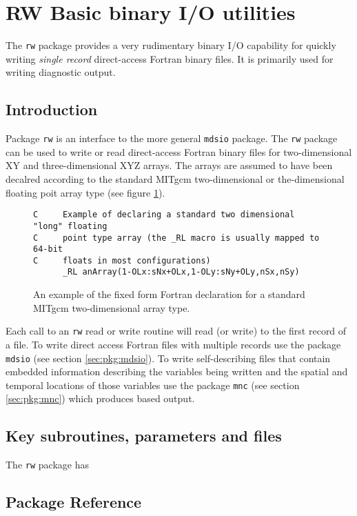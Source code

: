 \section{RW Basic binary I/O utilities}
\label{sec:pkg:rw}
The {\tt rw} package provides a very rudimentary binary I/O capability
for quickly writing {\it single record} direct-access Fortran binary files. 
It is primarily used for writing diagnostic output.

\subsection{Introduction}
Package {\tt rw} is an interface to the more general {\tt mdsio} package.
The {\tt rw} package can be used to write or read direct-access Fortran 
binary files for two-dimensional XY and three-dimensional XYZ arrays. 
The arrays are assumed to have been decalred according to the standard
MITgcm two-dimensional or the-dimensional floating poit array type 
(see figure \ref{fig:pkg:rw:standarddeclaration}).

\begin{figure}
\begin{verbatim}
C     Example of declaring a standard two dimensional "long" floating
C     point type array (the _RL macro is usually mapped to 64-bit 
C     floats in most configurations)
      _RL anArray(1-OLx:sNx+OLx,1-OLy:sNy+OLy,nSx,nSy)
\end{verbatim}
\caption{An example of the fixed form Fortran declaration for a 
standard MITgcm two-dimensional array type.  }
\label{fig:pkg:rw:standarddeclaration}
\end{figure}

Each call to an {\tt rw} read or write routine will read (or write) to the 
first record of a file. To write direct access Fortran files with 
multiple records use the package {\tt mdsio} (see section 
\ref{sec:pkg:mdsio}). To write self-describing files that contain
embedded information describing the variables being written and
the spatial and temporal locations of those variables use the 
package {\tt mnc} (see section \ref{sec:pkg:mnc}) which produces 
\cite{rew:97} based output.

\subsection{Key subroutines, parameters and files}
\label{sec:pkg:rw:implementation_synopsis}
The {\tt rw} package has 
\subsection{Package Reference}
